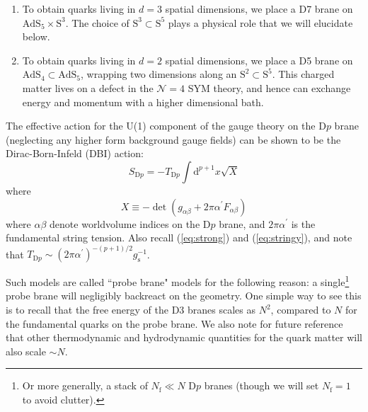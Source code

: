 \documentclass[10pt, oneside]{book}
\begin{document}
\begin{doublespace}
\begin{enumerate}
\item To obtain quarks living in $d=3$ spatial dimensions, we place a  D7 brane on $\mathrm{AdS}_5\times \mathrm{S}^3$.  The choice of $\mathrm{S}^3 \subset \mathrm{S}^5$ plays a physical role that we will elucidate below.
\item To obtain quarks living in $d=2$ spatial dimensions, we place a D5 brane on $\mathrm{AdS}_4 \subset \mathrm{AdS}_5$,  wrapping two dimensions along an $\mathrm{S}^2\subset \mathrm{S}^5$.  This charged matter lives on a defect in the $\mathcal{N}=4$ SYM theory, and hence can exchange energy and momentum with a higher dimensional bath.
\end{enumerate}

The effective action for the U(1) component of the gauge theory on the D$p$ brane (neglecting any higher form background gauge fields) can be shown to be the Dirac-Born-Infeld (DBI) action: \begin{equation}
S_{\mathrm{D}p} = -T_{\mathrm{D}p}\int \mathrm{d}^{p+1}x \sqrt{X}  \label{eq:DBI}
\end{equation}
where \begin{equation}
X \equiv - \det \left(g_{\alpha\beta} + 2\pi \alpha^\prime F_{\alpha\beta}\right)  \label{eq:Xdet}
\end{equation}
where $\alpha\beta$ denote worldvolume indices on the D$p$ brane, and $2\pi \alpha^\prime$ is the fundamental string tension.   Also recall (\ref{eq:strong}) and (\ref{eq:stringy}), and note that $T_{\mathrm{D}p} \sim (2\pi  \alpha^\prime)^{-(p+1)/2} g_{\mathrm{s}}^{-1}$.     

Such models are called ``probe brane" models for the following reason:  a single\footnote{Or more generally, a stack of $N_{\mathrm{f}} \ll N$ D$p$ branes (though we will set $N_{\mathrm{f}}=1$ to avoid clutter).} probe brane will negligibly backreact on the geometry.   One simple way to see this is to recall that the free energy of the D3 branes scales as $N^2$, compared to $N$ for the fundamental quarks on the probe brane.  We also note for future reference that other thermodynamic and hydrodynamic quantities for the quark matter will also scale $\sim N$.     


\end{doublespace}
\end{document}
